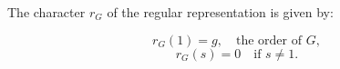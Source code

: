 The character $r_G$ of the regular representation is given by:

$$r_G(1) = g, \quad \text{the order of } G,$$
$$r_G(s) = 0 \quad \text{if } s \neq 1.$$
